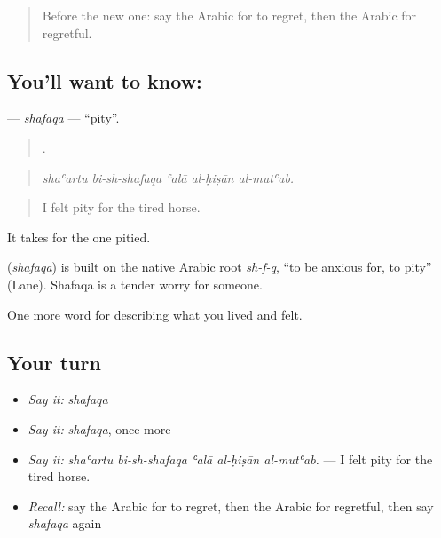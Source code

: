 \begin{quote}
Before the new one: say the Arabic for to regret, then the Arabic for regretful.
\end{quote}

\subsection*{You'll want to know: }
\textbf{} — \emph{shafaqa} — \textquotedblleft{}pity\textquotedblright{}.

\begin{quote}
    .
\end{quote}

\begin{quote}
\emph{shaʿartu bi-sh-shafaqa ʿalā al-ḥiṣān al-mutʿab.}
\end{quote}

\begin{quote}
I felt pity for the tired horse.
\end{quote}

It takes  for the one pitied.

\begin{cousinweb}
\textbf{} (\emph{shafaqa}) is built on the native Arabic root \emph{sh-f-q}, \textquotedblleft{}to be anxious for, to pity\textquotedblright{} (Lane). Shafaqa is a tender worry for someone.
\end{cousinweb}

\begin{grammarlens}[title={What you've built}]
One more word for describing what you lived and felt.
\end{grammarlens}

\subsection*{Your turn}
\begin{itemize}
\raggedright
  \item \emph{Say it:} \emph{shafaqa}
  \item \emph{Say it:} \emph{shafaqa}, once more
  \item \emph{Say it:} \emph{shaʿartu bi-sh-shafaqa ʿalā al-ḥiṣān al-mutʿab.} — I felt pity for the tired horse.
  \item \emph{Recall:} say the Arabic for to regret, then the Arabic for regretful, then say \emph{shafaqa} again
\end{itemize}

